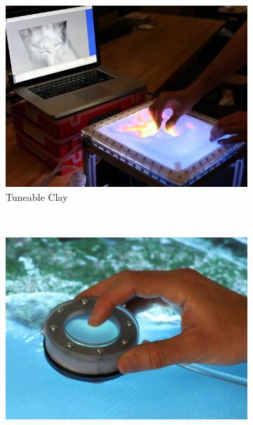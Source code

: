 \begin{figure}
        \centering
        \begin{subfigure}[b]{0.4\textwidth}
                \centering
                \includegraphics[width=\textwidth]{figures/jamming/jui_tunable-clay}
                \caption{Tuneable Clay}
                \label{fig:ch:jamming:jui-clay}
        \end{subfigure}%
        ~ %
        \begin{subfigure}[b]{0.4\textwidth}
                \centering
                \includegraphics[width=\textwidth]{figures/jamming/jui_haptic-lens}

\end{subfigure}
\end{figure}
